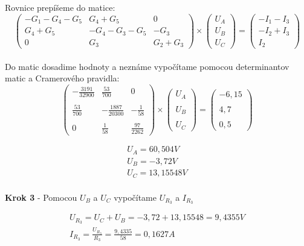 Rovnice prepíšeme do matice: \\

\begin{equation*}
\begin{pmatrix}
-G_1 - G_4 - G_5 & G_4 + G_5 & 0 \\
G_4 + G_5 & -G_4 - G_3 - G_5 & -G_3 \\
0 & G_3 & G_2 + G_3 
\end{pmatrix}
\times
\begin{pmatrix}
U_A \\
U_B \\
U_C 
\end{pmatrix}
=
\begin{pmatrix}
-I_1 - I_3 \\
-I_2 + I_3 \\
I_2
\end{pmatrix}
\end{equation*}
\\

Do matic dosadime hodnoty a neznáme vypočítame pomocou determinantov matic a Cramerového pravidla: \\

\begin{equation*}
\begin{pmatrix}
- \frac {3191} {32900} & \frac {53} {700} & 0 \\\\
 \frac {53} {700} & - \frac {1887} {20300} & - \frac {1}{58} \\\\
0 &\frac {1}{58} & \frac {97} {2262} 
\end{pmatrix}
\times
\begin{pmatrix}
U_A \\\\
U_B \\\\
U_C 
\end{pmatrix}
=
\begin{pmatrix}
-6,15 \\\\
4,7 \\\\
0,5
\end{pmatrix}
\end{equation*}

\begin{gather*}
U_A = 60,504 V \\
 U_B = -3,72 V \\
U_C = 13,15548 V \\
\end{gather*}

\begin{center}
    \textbf{Krok 3} - Pomocou $U_{B}$ a $U_{C}$ vypočítame $U_{R_{3}}$ a $I_{R_{3}}$ 
\end{center}

\begin{gather*}
    U_{R_{3}} = U_C +  U_B = -3,72 + 13,15548 = 9,4355 V \\
    I_{R_{3}} = \frac {U_{R_{3}}} {R_3} = \frac {9,4335} {58} = 0,1627 A
\end{gather*}

